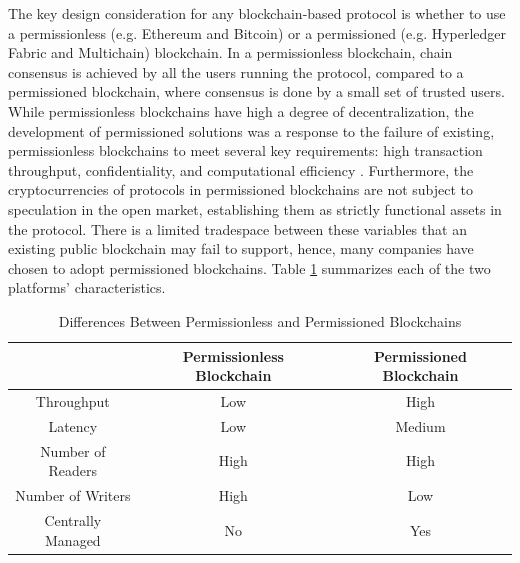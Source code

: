 The key design consideration for any blockchain-based protocol is whether to use a permissionless (e.g. Ethereum and Bitcoin) or a permissioned (e.g. Hyperledger Fabric and Multichain) blockchain. In a permissionless blockchain, chain consensus is achieved by all the users running the protocol, compared to a permissioned blockchain, where consensus is done by a small set of trusted users. While permissionless blockchains have high a degree of decentralization, the development of permissioned solutions was a response to the failure of existing, permissionless blockchains to meet several key requirements: high transaction throughput, confidentiality, and computational efficiency \cite{Vitalik15}. Furthermore, the cryptocurrencies of protocols in permissioned blockchains are not subject to speculation in the open market, establishing them as strictly functional assets in the protocol. There is a limited tradespace between these variables that an existing public blockchain may fail to support, hence, many companies have chosen to adopt permissioned blockchains. Table \ref{table:blockchaintypes} summarizes each of the two platforms' characteristics.
%
\begin{table}[h]
\centering
 \begin{tabular}{|c | c | c |} 
 \hline
  &  Permissionless Blockchain & Permissioned Blockchain \\ 
 \hline
 Throughput & Low & High  \\
 \hline
 Latency & Low & Medium \\
 \hline
 Number of Readers & High & High \\
 \hline
Number of Writers & High & Low \\
 \hline
 Centrally Managed & No & Yes \\
 \hline
\end{tabular}
\caption{Differences Between Permissionless and Permissioned Blockchains} \label{table:blockchaintypes}
\end{table}

